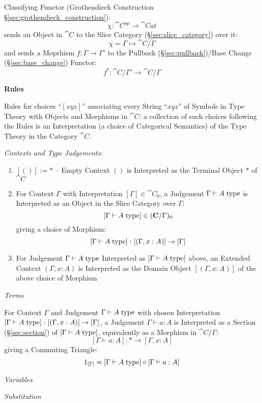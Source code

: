 Classifying Functor (Grothendieck Construction
\S\ref{sec:grothendieck_construction}):
\[
  \chi : \cat{C}^{op} \rightarrow \cat{Cat}
\]
sends an Object in $\cat{C}$ to the Slice Category
(\S\ref{sec:slice_category}) over it:
\[
  \chi = \Gamma \mapsto \cat{C}/\Gamma
\]
and sends a Moprhism $f : \Gamma \rightarrow \Gamma'$ to the Pullback
(\S\ref{sec:pullback})/Base Change (\S\ref{sec:base_change}) Functor:
\[
  f^* : \cat{C}/\Gamma' \rightarrow \cat{C}/\Gamma
\]


\textbf{Rules}

Rules for choices ``$[xyz]$'' associating every String ``$xyz$'' of
Symbols in Type Theory with Objects and Morphisms in $\cat{C}$: a
collection of such choices following the Rules is an Interpretation (a
choice of Categorical Semantics) of the Type Theory in the Category
$\cat{C}$.

\emph{Contexts and Type Judgements}:
\begin{enumerate}
  \item $[()] := *$ -- Empty Context $()$ is Interpreted as the
    Terminal Object $*$ of $\cat{C}$
  \item For Context $\Gamma$ with Interpretation $[\Gamma] \in
    \cat{C}_0$, a Judgement $\Gamma \vdash A\;\mathrm{type}$ is Interpreted
    as an Object in the Slice Category over $\Gamma$:
    \[
      [\Gamma \vdash A\;\mathrm{type}] \in (\mathbf{C}/\Gamma)_0
    \]
    giving a choice of Morphism:
    \[
      [\Gamma \vdash A\;\mathrm{type}] : [(\Gamma,x:A)] \rightarrow [\Gamma]
    \]
  \item For Judgement $\Gamma \vdash A\;\mathrm{type}$ Interpreted as $[\Gamma
    \vdash A\;\mathrm{type}]$ above, an Extended Context $(\Gamma,x:A)$ is
    Interpreted as the Domain Object $[(\Gamma,x:A)]$ of the above
    choice of Morphism
\end{enumerate}

\emph{Terms}

For Context $\Gamma$ and Judgement $\Gamma \vdash A\;\mathrm{type}$ with chosen
Interpretation $[\Gamma \vdash A\;\mathrm{type}] : [(\Gamma,x:A)] \rightarrow
[\Gamma]$, a Judgement $\Gamma \vdash a:A$ is Interpreted as a Section
(\S\ref{sec:section}) of $[\Gamma \vdash A\;\mathrm{type}]$, equivalently as a
Morphism in $\cat{C}/\Gamma$:
\[
  [\Gamma \vdash a:A]: * \rightarrow [\Gamma,x:A]
\]
giving a Commuting Triangle:
\[
  1_{[\Gamma]} = [\Gamma \vdash A\;\mathrm{type}] \circ [\Gamma \vdash a:A]
\]

\emph{Variables}

\emph{Substitution}



